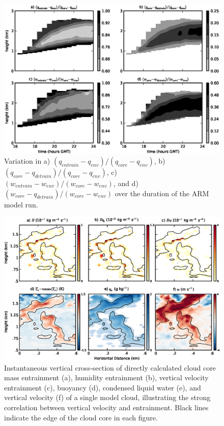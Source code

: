 \documentclass[12pt]{article}
\begin{document}
\begin{figure}[t]
  \noindent\includegraphics[width=39pc]{./figures/shell_variability}
  \caption{Variation in a) $(q_{entrain} - q_{env})/(q_{core} - q_{env})$,  
  b) $(q_{core} - q_{detrain})/(q_{core} - q_{env})$,  
  c) $(w_{entrain} - w_{env})/(w_{core} - w_{env})$, and 
  d) $(w_{core} - q_{detrain})/(w_{core} - w_{env})$ over the duration of the 
  ARM model run.
  }
  \label{fig:shell_variability}
\end{figure}

\begin{figure}[t]
  \noindent\includegraphics[width=39pc]{./figures/w_entrainment_example}
  \caption{Instantaneous vertical cross-section of directly calculated cloud 
  core mass entrainment (a), humidity entrainment (b), vertical velocity
  entrainment (c), buoyancy (d), condensed liquid water (e), and vertical
  velocity (f) of a single model cloud, illustrating the strong correlation
  between vertical velocity and entrainment.  Black lines indicate the edge of
  the cloud core in each figure.}
  \label{fig:w_entrainment_example}
\end{figure}
\end{document}
